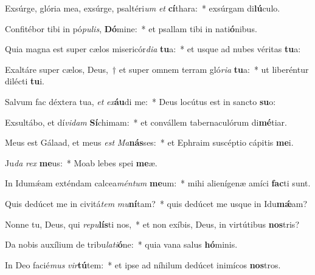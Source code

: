 \item Exsúrge, glória mea, exsúrge, psaltéri\textit{um} \textit{et} \textbf{cí}thara:~* exsúrgam di\textbf{lú}culo.
\item Confitébor tibi in pó\textit{pu}\textit{lis}, \textbf{Dó}mine:~* et psallam tibi in nati\textbf{ó}nibus.
\item Quia magna est super cælos misericór\textit{di}\textit{a} \textbf{tu}a:~* et usque ad nubes véritas \textbf{tu}a:
\item Exaltáre super cælos, Deus,~† et super omnem terram gló\textit{ri}\textit{a} \textbf{tu}a:~* ut liberéntur dilécti \textbf{tu}i.
\item Salvum fac déxtera tua, \textit{et} \textit{ex}\textbf{áu}di me:~* Deus locútus est in sancto \textbf{su}o:
\item Exsultábo, et dí\textit{vi}\textit{dam} \textbf{Sí}chimam:~* et convállem tabernaculórum di\textbf{mé}tiar.
\item Meus est Gálaad, et meus \textit{est} \textit{Ma}\textbf{nás}ses:~* et Ephraim suscéptio cápitis \textbf{me}i.
\item Ju\textit{da} \textit{rex} \textbf{me}us:~* Moab lebes spei \textbf{me}æ.
\item In Idumǽam exténdam calcea\textit{mén}\textit{tum} \textbf{me}um:~* mihi alienígenæ amíci \textbf{fac}ti sunt.
\item Quis dedúcet me in civitá\textit{tem} \textit{mu}\textbf{ní}tam?~* quis dedúcet me usque in Idu\textbf{mǽ}am?
\item Nonne tu, Deus, qui \textit{re}\textit{pu}\textbf{lís}ti nos,~* et non exíbis, Deus, in virtútibus \textbf{nos}tris?
\item Da nobis auxílium de tribu\textit{la}\textit{ti}\textbf{ó}ne:~* quia vana salus \textbf{hó}minis.
\item In Deo facié\textit{mus} \textit{vir}\textbf{tú}tem:~* et ipse ad níhilum dedúcet inimícos \textbf{nos}tros.
